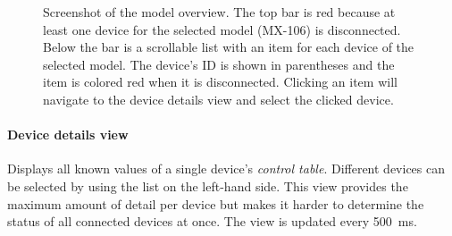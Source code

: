\begin{figure}[H]
    \centering
    \setlength{\fboxsep}{0mm}
    \caption[Screenshot of the model overview]{
        Screenshot of the model overview. The top bar is red because at least one device for the
        selected model (MX-106) is disconnected. Below the bar is a scrollable list with an item for
        each device of the selected model. The device's ID is shown in parentheses and the item is
        colored red when it is disconnected. Clicking an item will navigate to the device details view
        and select the clicked device.
    }
\end{figure}

\clearpage
\paragraph{Device details view}

Displays all known values of a single device's \textit{control table}. Different devices can be selected
by using the list on the left-hand side. This view provides the maximum amount of detail per device
but makes it harder to determine the status of all connected devices at once. The view is updated every
\SI{500}{\milli\second}.

